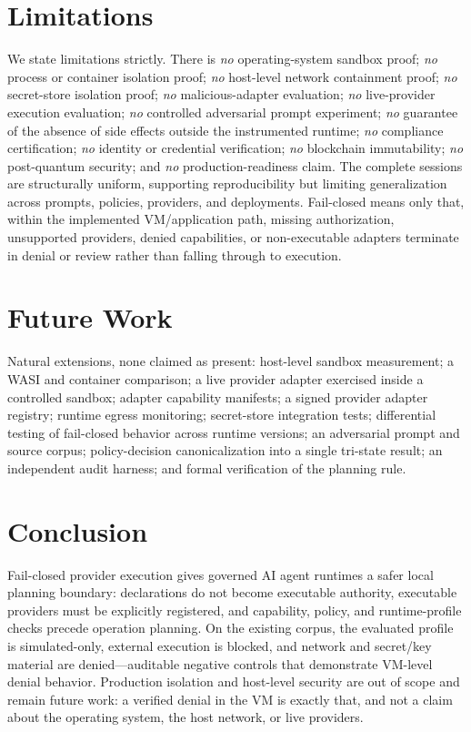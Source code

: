 \documentclass[conference]{IEEEtran}
\begin{document}
\section{Limitations}\label{sec:limits}
We state limitations strictly. There is \emph{no} operating-system sandbox proof;
\emph{no} process or container isolation proof; \emph{no} host-level network containment
proof; \emph{no} secret-store isolation proof; \emph{no} malicious-adapter evaluation;
\emph{no} live-provider execution evaluation; \emph{no} controlled adversarial prompt
experiment; \emph{no} guarantee of the absence of side effects outside the instrumented
runtime; \emph{no} compliance certification; \emph{no} identity or credential
verification; \emph{no} blockchain immutability; \emph{no} post-quantum security; and
\emph{no} production-readiness claim. The complete sessions are structurally uniform,
supporting reproducibility but limiting generalization across prompts, policies, providers,
and deployments. Fail-closed means only that, within the implemented VM/application path,
missing authorization, unsupported providers, denied capabilities, or non-executable
adapters terminate in denial or review rather than falling through to execution.

\section{Future Work}\label{sec:future}
Natural extensions, none claimed as present: host-level sandbox measurement; a WASI and
container comparison; a live provider adapter exercised inside a controlled sandbox;
adapter capability manifests; a signed provider adapter registry; runtime egress
monitoring; secret-store integration tests; differential testing of fail-closed behavior
across runtime versions; an adversarial prompt and source corpus; policy-decision
canonicalization into a single tri-state result; an independent audit harness; and formal
verification of the planning rule.

\section{Conclusion}\label{sec:conclusion}
Fail-closed provider execution gives governed AI agent runtimes a safer local planning
boundary: declarations do not become executable authority, executable providers must be
explicitly registered, and capability, policy, and runtime-profile checks precede operation
planning. On the existing corpus, the evaluated profile is simulated-only, external
execution is blocked, and network and secret/key material are denied---auditable negative
controls that demonstrate VM-level denial behavior. Production isolation and host-level
security are out of scope and remain future work: a verified denial in the VM is exactly
that, and not a claim about the operating system, the host network, or live providers.
\end{document}
